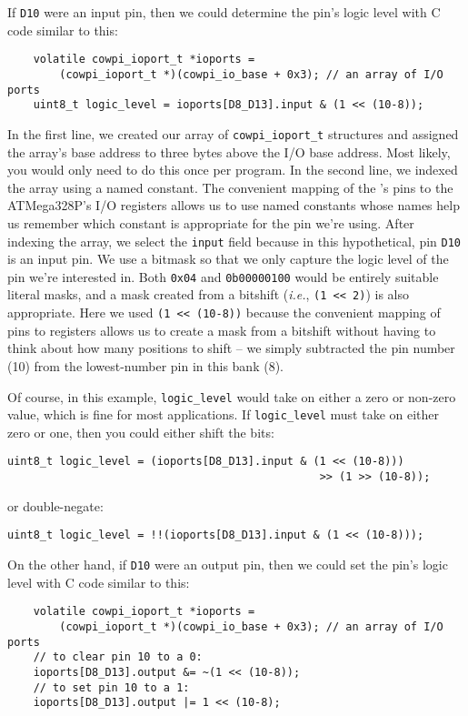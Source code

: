 If \texttt{D10} were an input pin, then we could determine the pin's logic level with C code similar to this:
\begin{lstlisting}
    volatile cowpi_ioport_t *ioports =
        (cowpi_ioport_t *)(cowpi_io_base + 0x3); // an array of I/O ports
    uint8_t logic_level = ioports[D8_D13].input & (1 << (10-8));
\end{lstlisting}
In the first line, we created our array of \lstinline{cowpi_ioport_t} structures and assigned the array's base address to three bytes above the I/O base address.
Most likely, you would only need to do this once per program.
In the second line, we indexed the array using a named constant.
The convenient mapping of the \mcuboard's pins to the ATMega328P's I/O registers allows us to use named constants whose names help us remember which constant is appropriate for the pin we're using.
After indexing the array, we select the \lstinline{input} field because in this hypothetical, pin \texttt{D10} is an input pin.
We use a bitmask so that we only capture the logic level of the pin we're interested in.
Both \lstinline{0x04} and \lstinline{0b00000100} would be entirely suitable literal masks, and a mask created from a bitshift (\textit{i.e.}, \lstinline{(1 << 2)}) is also appropriate.
Here we used \lstinline{(1 << (10-8))} because the convenient mapping of pins to registers allows us to create a mask from a bitshift without having to think about how many positions to shift -- we simply subtracted the pin number (10) from the lowest-number pin in this bank (8).

Of course, in this example, \lstinline{logic_level} would take on either a zero or non-zero value, which is fine for most applications.
If \lstinline{logic_level} must take on either zero or one, then you could either shift the bits:
\begin{lstlisting}[firstnumber=3]
    uint8_t logic_level = (ioports[D8_D13].input & (1 << (10-8)))
                                                >> (1 >> (10-8));
\end{lstlisting}
or double-negate:
\begin{lstlisting}[firstnumber=3]
    uint8_t logic_level = !!(ioports[D8_D13].input & (1 << (10-8)));
\end{lstlisting}

On the other hand, if \texttt{D10} were an output pin, then we could set the pin's logic level with C code similar to this:
\begin{lstlisting}
    volatile cowpi_ioport_t *ioports =
        (cowpi_ioport_t *)(cowpi_io_base + 0x3); // an array of I/O ports
    // to clear pin 10 to a 0:
    ioports[D8_D13].output &= ~(1 << (10-8));
    // to set pin 10 to a 1:
    ioports[D8_D13].output |= 1 << (10-8);
\end{lstlisting}

